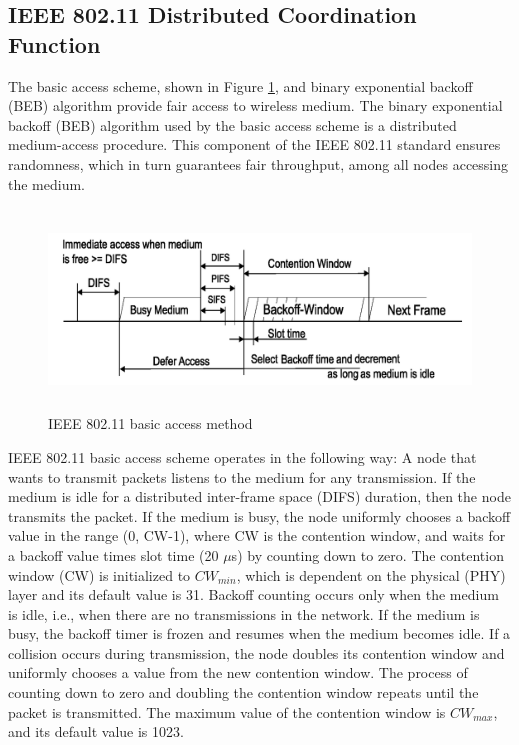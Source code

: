 \documentclass[12pt,letterpaper,english]{article}
\begin{document}
\subsection{IEEE 802.11 Distributed Coordination Function}
\indent The basic access scheme, shown in Figure \ref{figure:basicaccess}, and binary exponential backoff (BEB) algorithm provide fair access to wireless medium. The binary exponential backoff (BEB) algorithm used by the basic access scheme is a distributed medium-access procedure. This component of the IEEE 802.11 standard ensures randomness, which in turn guarantees fair throughput, among all nodes accessing the medium.
\begin{figure}[H]
\centering
\includegraphics[width=4.5in,height=2.1in]{figures/backoff.png}
\caption{IEEE 802.11 basic access method}
\label{figure:basicaccess}
\end{figure}
IEEE 802.11 basic access scheme operates in the following way: A node that wants to transmit packets listens to the medium for any transmission. If the medium is idle for a distributed inter-frame space (DIFS) duration, then the node transmits the packet. 
If the medium is busy, the node uniformly chooses a backoff value in the range (0, CW-1), where CW is the contention window, and waits for a backoff value 
times slot time (20 $\mu$s) by counting down to zero. The contention window (CW) is initialized to $CW_{min}$, which is dependent on the physical (PHY) layer and its default value is 31. 
Backoff counting occurs only when the medium is idle, i.e., when there are no transmissions in the network. If the medium is busy, the backoff timer is frozen and resumes when the medium becomes idle. 
If a collision occurs during transmission, the node doubles its contention window and uniformly chooses a value from the new contention window. 
The process of counting down to zero and doubling the contention window repeats until the packet is transmitted. The maximum value of the contention window is $CW_{max}$, and its default value is 1023.
\end{document}
